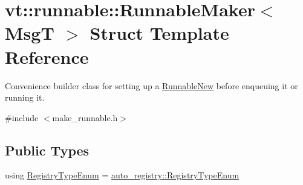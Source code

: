 \hypertarget{structvt_1_1runnable_1_1_runnable_maker}{}\section{vt\+:\+:runnable\+:\+:Runnable\+Maker$<$ MsgT $>$ Struct Template Reference}
\label{structvt_1_1runnable_1_1_runnable_maker}


Convenience builder class for setting up a {\ttfamily \hyperlink{structvt_1_1runnable_1_1_runnable_new}{Runnable\+New}} before enqueuing it or running it.  




{\ttfamily \#include $<$make\+\_\+runnable.\+h$>$}

\subsection*{Public Types}
\begin{DoxyCompactItemize}
\item 
using \hyperlink{structvt_1_1runnable_1_1_runnable_maker_a686c9c671055431e7d1624bc60025cc5}{Registry\+Type\+Enum} = \hyperlink{namespacevt_1_1auto__registry_a9f369ca2b484130b396729e2ddf05241}{auto\+\_\+registry\+::\+Registry\+Type\+Enum}
\end{DoxyCompactItemize}
